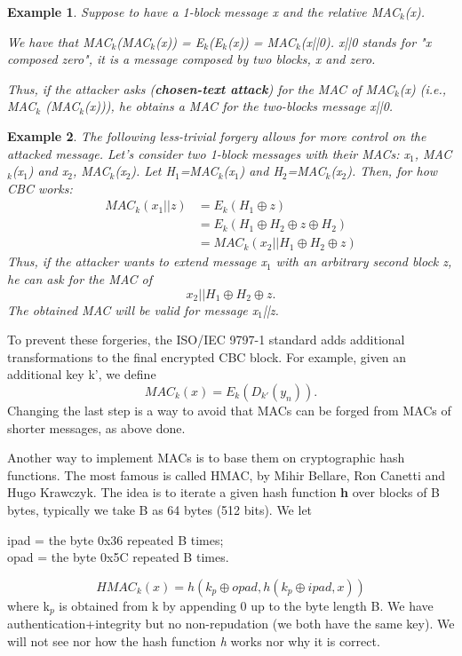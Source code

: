 \documentclass[a4paper, 12pt]{report}
\newtheorem{example}{\textbf{Example}}
\begin{document}
\begin{example}
	Suppose to have a 1-block message x and the relative MAC$_k$(x). 
	
	We have that MAC$_k$(MAC$_k$(x)) = E$_k$(E$_k$(x)) = MAC$_k$(x||0). x||0 stands for "x composed zero", it is a message composed by two blocks, x and zero.
	
	Thus, if the attacker asks (\textbf{chosen-text attack}) for the MAC of MAC$_k$(x) (i.e., MAC$_k$ (MAC$_k$(x))), he obtains a MAC for the two-blocks message x||0.
\end{example}

\begin{example}
	The following less-trivial forgery allows for more control on the attacked message. Let's consider two 1-block messages with their MACs: x$_1$, MAC$_k$(x$_1$) and x$_2$, MAC$_k$(x$_2$). Let H$_1$=MAC$_k$(x$_1$) and H$_2$=MAC$_k$(x$_2$). Then, for how CBC works:
	\begin{align*}
	MAC_k(x_1||z) &= E_k(H_1 \oplus z)\\
	&= E_k(H_1 \oplus H_2 \oplus z \oplus H_2)\\
	&= MAC_k(x_2||H_1 \oplus H_2 \oplus z)
	\end{align*}
	Thus, if the attacker wants to extend message x$_1$ with an arbitrary second block z, he can ask for the MAC of
	\[x_2||H_1 \oplus H_2 \oplus z.\]
	The obtained MAC will be valid for message x$_1$||z.
\end{example}

To prevent these forgeries, the ISO/IEC 9797-1 standard adds additional transformations to the final encrypted CBC block. For example, given an additional key k', we define
\[MAC_k(x) = E_k(D_{k'}(y_n)).\]
Changing the last step is a way to avoid that MACs can be forged from MACs of shorter messages, as above done.

Another way to implement MACs is to base them on cryptographic hash functions. The most famous is called HMAC, by Mihir Bellare, Ron Canetti and Hugo Krawczyk. The idea is to iterate a given hash function \textbf{h} over blocks of B bytes, typically we take B as 64 bytes (512 bits). We let
\begin{center}
	ipad = the byte 0x36 repeated B times;\\
	opad = the byte 0x5C repeated B times.
\end{center} 
\[HMAC_k(x) = h(k_p \oplus opad, h(k_p \oplus ipad, x))\]
where k$_p$ is obtained from k by appending 0 up to the byte length B. We have authentication+integrity but no non-repudation (we both have the same key). We will not see nor how the hash function \textit{h} works nor why it is correct.
\end{document}
